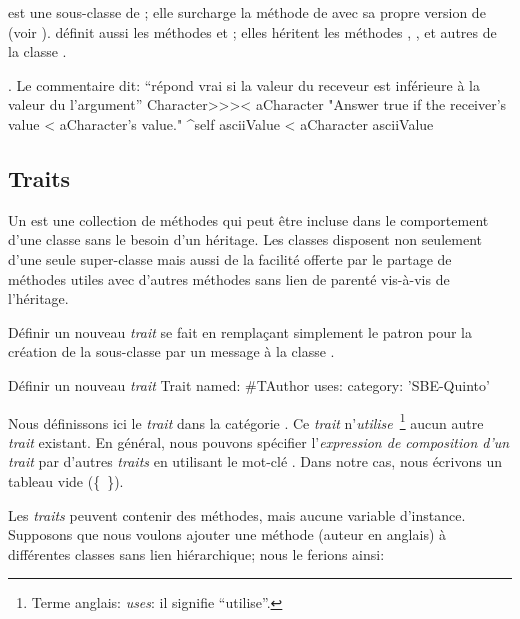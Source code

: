 \documentclass[a4paper,10pt,twoside]{book}
\begin{document}
 est une sous-classe de ; elle surcharge la m\'ethode  de \ct{<} avec sa propre version de \ct{<} (voir ).   d\'efinit aussi les m\'ethodes \ct{=} et ; elles h\'eritent les m\'ethodes \ct{>=}, \ct{<=}, \ct{~=} et autres de la classe .

\begin{method}[CharacterLessThan]{. Le commentaire dit: ``r\'epond vrai si la valeur du receveur est inf\'erieure \`a la valeur du l'argument''}
Character>>>< aCharacter 
	"Answer true if the receiver's value < aCharacter's value."
	^self asciiValue < aCharacter asciiValue
\end{method}

\subsection{Traits}
Un  est une collection de m\'ethodes qui peut \^etre incluse dans le comportement d'une classe sans le besoin d'un h\'eritage.
Les classes disposent non seulement d'une seule super-classe mais aussi de la facilit\'e offerte par le partage de m\'ethodes utiles avec d'autres m\'ethodes sans lien de parent\'e vis-\`a-vis de l'h\'eritage.

D\'efinir un nouveau \emph{trait} se fait en rempla\c{c}ant simplement le patron
pour la cr\'eation de la sous-classe par un message \`a la classe .

\begin{classdef}[tauthor]{D\'efinir un nouveau \emph{trait}}
Trait named: #TAuthor
	uses: { }
	category: 'SBE-Quinto'
\end{classdef}

\noindent
Nous d\'efinissons ici le \emph{trait}  dans la cat\'egorie .
Ce \emph{trait} n'\emph{utilise}~\footnote{Terme anglais: \emph{uses}: il signifie ``utilise''.} aucun autre \emph{trait} existant.
En g\'en\'eral, nous pouvons sp\'ecifier l'\emph{expression de composition d'un trait} par d'autres \emph{traits} en u\-ti\-li\-sant le mot-cl\'e .
Dans notre cas, nous \'ecrivons un tableau vide \mbox{(\{ \}).}

Les \emph{traits} peuvent contenir des m\'ethodes, mais aucune variable d'instance.
Supposons que nous voulons ajouter une m\'ethode  (auteur en anglais) \`a diff\'erentes classes sans lien hi\'erarchique;
nous le ferions ainsi:
\end{document}
